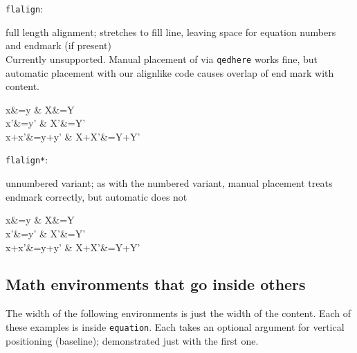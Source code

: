 \documentclass[leqno]{article}
\newcommand{\testtype}[2]{\texttt{#1}:%
  #2}
\newcommand{\makeoutertest}[3]{
  \begin{test}
    \testtype{#1}{#2}
    #3
  \end{test}
}
\newcommand{\maketest}[3]{
  \makeoutertest{#1}{#2}{
    \begin{#1}
      #3
    \end{#1}
  }
}
\begin{document}
\maketest{flalign}{
  full length alignment; stretches to fill line, leaving space for equation numbers and endmark (if present)\\
  Currently unsupported.  Manual placement of via \texttt{qedhere} works fine, but automatic placement with our alignlike code causes overlap of end mark with content.
}{
  x&=y & X&=Y\\
  x'&=y' & X'&=Y'\\
  x+x'&=y+y' & X+X'&=Y+Y'%
}
\maketest{flalign*}{
  unnumbered variant; as with the numbered variant, manual placement treats endmark correctly, but automatic does not\\
}{
  x&=y & X&=Y\\
  x'&=y' & X'&=Y'\\
  x+x'&=y+y' & X+X'&=Y+Y' %
}


\subsection{Math environments that go inside others}
The width of the following environments is just the width of the content.
Each of these examples is inside \texttt{equation}.
Each takes an optional argument for vertical positioning (baseline); demonstrated just with the first one.
\end{document}
